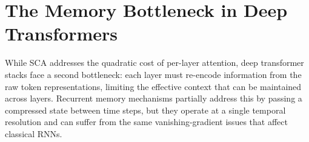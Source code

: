 \section{The Memory Bottleneck in Deep Transformers}

While SCA addresses the quadratic cost of per-layer attention, deep transformer stacks
face a second bottleneck: each layer must re-encode information from the raw token
representations, limiting the effective context that can be maintained across layers.
Recurrent memory mechanisms \cite{dai2019transformer, rae2019compressive} partially
address this by passing a compressed state between time steps, but they operate at a
single temporal resolution and can suffer from the same vanishing-gradient issues that
affect classical RNNs.
